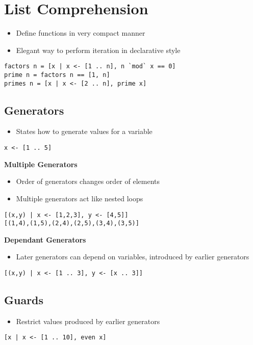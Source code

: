 
\section{List Comprehension}
\begin{itemize}
    \item Define functions in very compact manner
    \item Elegant way to perform iteration in declarative style
\end{itemize}
\begin{lstlisting}
factors n = [x | x <- [1 .. n], n `mod` x == 0]
prime n = factors n == [1, n]
primes n = [x | x <- [2 .. n], prime x]
\end{lstlisting}

\subsection{Generators}
\begin{itemize}
    \item States how to generate values for a variable
\end{itemize}
\begin{lstlisting}
x <- [1 .. 5]
\end{lstlisting}
\textbf{Multiple Generators}\\
\begin{itemize}
    \item Order of generators changes order of elements
    \item Multiple generators act like nested loops
\end{itemize}
\begin{lstlisting}
[(x,y) | x <- [1,2,3], y <- [4,5]]
[(1,4),(1,5),(2,4),(2,5),(3,4),(3,5)]
\end{lstlisting}
\textbf{Dependant Generators}
\begin{itemize}
    \item Later generators can depend on variables, introduced by earlier generators
\end{itemize}
\begin{lstlisting}
[(x,y) | x <- [1 .. 3], y <- [x .. 3]]
\end{lstlisting}

\subsection{Guards}
\begin{itemize}
    \item Restrict values produced by earlier generators
\end{itemize}
\begin{lstlisting}
[x | x <- [1 .. 10], even x]
\end{lstlisting}

